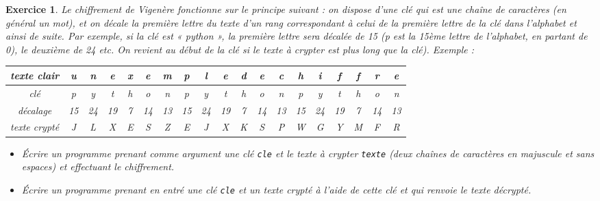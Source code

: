 \documentclass[11pt,a4paper]{article}
\newtheorem{ex}{Exercice}
\begin{document}
\begin{ex}
Le chiffrement de Vigenère fonctionne sur le principe suivant : on dispose d'une clé qui est une chaîne de caractères (en général un mot), et on décale la première lettre du texte d'un rang correspondant à celui de la première lettre de la clé dans l'alphabet et ainsi de suite. Par exemple, si la clé est « python », la première
lettre sera décalée de 15 (p est la 15ème lettre de l'alphabet, en partant de 0), le deuxième de 24 etc. On
revient au début de la clé si le texte à crypter est plus long que la clé).
Exemple :
\begin{tabular}{|c|| c|c|c|c|c|c|c|c|c|c|c|c|c|c|c|c|c|c|}
\hline
texte clair &  u & n&  e & x&  e&  m&  p&  l&  e&  d&  e&  c&  h&  i&  f&  f&  r&  e \\
\hline
clé&  p&  y&  t& h&  o&  n&  p&  y&  t&  h&  o&  n&  p&  y&  t&  h&  o&  n \\
\hline
décalage &  15&  24&  19&  7&  14&  13&  15&  24&  19&  7 & 14 &  13&  15&  24&  19&  7&  14&  13 \\
\hline
texte crypté &  J &  L &  X &  E &  S &  Z  &  E &  J  & X  & K  & S  & P &  W &  G &  Y  & M  & F  & R  \\
\hline
\end{tabular}




\begin{itemize}
\item[$1.$] Écrire un programme prenant comme argument une clé \texttt{cle} et le texte à crypter \texttt{texte} (deux
chaînes de caractères en majuscule et sans espaces) et effectuant le chiffrement.
\item[$2.$] Écrire un programme prenant en entré une clé \texttt{cle} et un texte crypté à l'aide de cette clé et qui renvoie le texte décrypté.
\end{itemize}

\end{ex}
\end{document}
